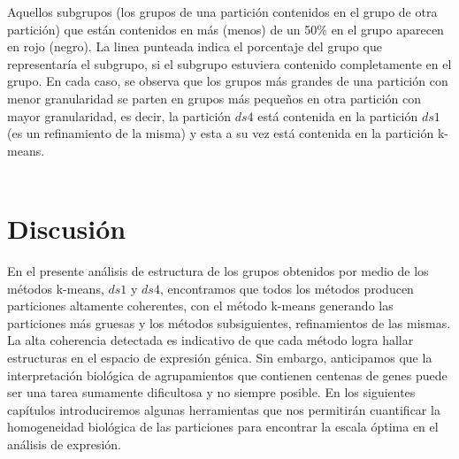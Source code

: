 
Aquellos subgrupos (los grupos de una partición contenidos en el grupo de otra partición) que están contenidos en más (menos) de un 50\% en el grupo aparecen en rojo (negro). La linea punteada indica el porcentaje del grupo que representaría el subgrupo, si el subgrupo estuviera contenido completamente en el grupo.
En cada caso, se observa que los grupos más grandes de una partición con menor granularidad se parten en grupos más pequeños en otra partición con mayor granularidad, es decir, la partición $ds4$ está contenida en la partición $ds1$ (es un refinamiento de la misma) y esta a su vez está contenida en la partición k-means.\\\\
\clearpage
\section{Discusión}
En el presente análisis de estructura de los grupos obtenidos por medio de los métodos k-means, $ds1$ y $ds4$, encontramos que todos los métodos producen particiones altamente coherentes, con el método k-means generando las particiones más gruesas y los métodos subsiguientes, refinamientos de las mismas. La alta coherencia detectada es indicativo de que cada método logra  hallar estructuras en el espacio de expresión génica. Sin embargo, anticipamos que la interpretación biológica de agrupamientos que contienen centenas de genes puede ser una tarea sumamente dificultosa y no siempre posible. En los siguientes capítulos introduciremos algunas herramientas que nos permitirán cuantificar la homogeneidad biológica de las particiones para encontrar la escala óptima en el análisis de expresión.